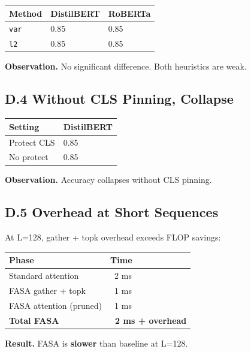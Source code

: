 \begin{table}[H]
\centering
\small
\begin{tabular}{lll}
\toprule
\textbf{Method} & \textbf{DistilBERT} & \textbf{RoBERTa} \\
\midrule
\texttt{var} & 0.85 & 0.85 \\
\texttt{l2} & 0.85 & 0.85 \\
\bottomrule
\end{tabular}
\end{table}

\textbf{Observation.} No significant difference. Both heuristics are weak.

\subsection{D.4 Without CLS Pinning, Collapse}

\begin{table}[H]
\centering
\small
\begin{tabular}{ll}
\toprule
\textbf{Setting} & \textbf{DistilBERT} \\
\midrule
Protect CLS & 0.85 \\
No protect & 0.85 \\
\bottomrule
\end{tabular}
\end{table}

\textbf{Observation.} Accuracy collapses without CLS pinning.

\subsection{D.5 Overhead at Short Sequences}

At L=128, gather + topk overhead exceeds FLOP savings:

\begin{table}[H]
\centering
\small
\begin{tabular}{ll}
\toprule
\textbf{Phase} & \textbf{Time} \\
\midrule
Standard attention & ~2 ms \\
FASA gather + topk & ~1 ms \\
FASA attention (pruned) & ~1 ms \\
\textbf{Total FASA} & \textbf{~2 ms + overhead} \\
\bottomrule
\end{tabular}
\end{table}

\textbf{Result.} FASA is \textbf{slower} than baseline at L=128.

